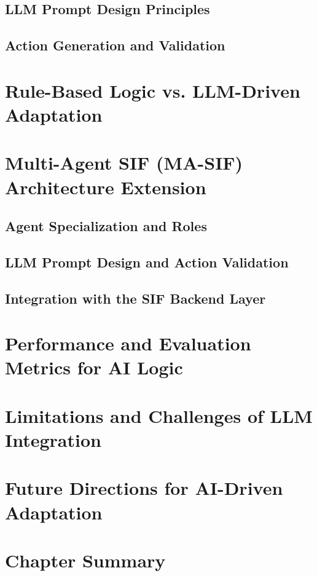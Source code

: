 \documentclass[openany]{book}
\begin{document}
    \subsection{LLM Prompt Design Principles}
    \subsection{Action Generation and Validation}

\section{Rule-Based Logic vs. LLM-Driven Adaptation}

\section{Multi-Agent SIF (MA-SIF) Architecture Extension}
    \subsection{Agent Specialization and Roles}
    \subsection{LLM Prompt Design and Action Validation}
    \subsection{Integration with the SIF Backend Layer}

\section{Performance and Evaluation Metrics for AI Logic}

\section{Limitations and Challenges of LLM Integration}

\section{Future Directions for AI-Driven Adaptation}

\section{Chapter Summary}
\end{document}
